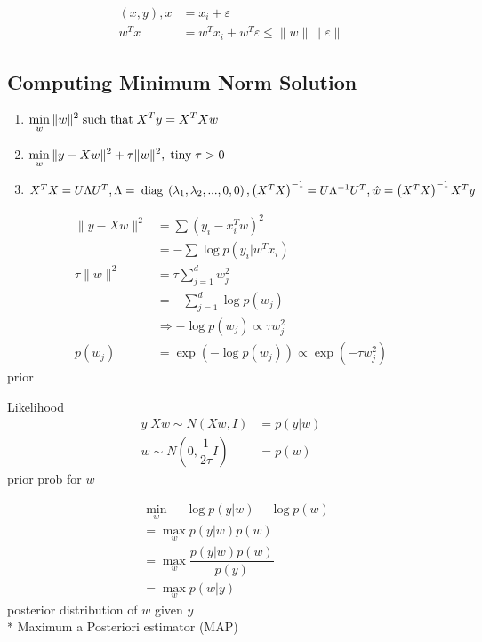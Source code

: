 \documentclass{article}
\begin{document}
\begin{align*}
\left(x , y \right) ,x &= x_{i} + \varepsilon
\\ w^{T} x &= w^{T} x_{i} + w^{T} \varepsilon \leq  \| w \| \| \varepsilon \|
\end{align*}


\subsection{Computing Minimum Norm Solution}
\begin{enumerate}
\item $\displaystyle\min_{w} \| w \|^{2} \text{\;such that\;} X^{T} y = X^{T} X w $
\item $\displaystyle\min_{w} \| y - X w \|^{2} + \tau \| w \|^{2}, \text{\;tiny\;} \tau > 0$
\item $X^{T} X = U \Lambda U^{T}, \Lambda = \text{\;diag\;} \left(\lambda_{1}, \lambda_{2}, ..., 0, 0\right), \left(X^{T} X\right)^{-1} = U \Lambda^{-1} U^{T}, \hat{w} = \left(X^{T} X\right)^{-1} X^{T} y $
\end{enumerate}

\begin{align*}
\| y - X w \|^{2} &= \displaystyle\sum \left(y_{i} - x_{i}^{T} w\right)^{2}
\\ &= - \displaystyle\sum \log p\left(y_{i} | w^{T} x_{i}\right)
\\ \tau \| w \|^{2} &= \tau \displaystyle\sum_{j=1}^{d} w_{j}^{2}
\\ &= - \displaystyle\sum_{j=1}^{d} \log p\left(w_{j}\right)
\\ &\Rightarrow  - \log p\left(w_{j}\right) \propto \tau w_{j}^{2}
\\ p\left(w_{j}\right)  &= \exp\left(- \log p\left(w_{j}\right)\right) \propto \exp\left(- \tau w_{j}^{2}\right)
\end{align*}
prior

Likelihood
\begin{align*}
y  | X w \sim  N\left(X w, I\right) &= p\left(y | w \right)
\\ w  \sim  N\left(0, \dfrac{1}{2 \tau} I \right) &= p\left(w \right)
\end{align*}
prior prob for $w $

\begin{align*}
&  \displaystyle\min_{w} - \log p\left(y | w\right) - \log p\left(w \right)
\\ &= \displaystyle\max_{w} p\left(y | w\right) p\left(w \right)
\\ &= \displaystyle\max_{w} \dfrac{p\left(y | w\right) p\left(w \right)}{p\left(y\right)}
\\ &= \displaystyle\max_{w} p\left(w | y \right)
\end{align*}
posterior distribution of $w $ given $y $
\\* Maximum a Posteriori estimator (MAP)
\end{document}
